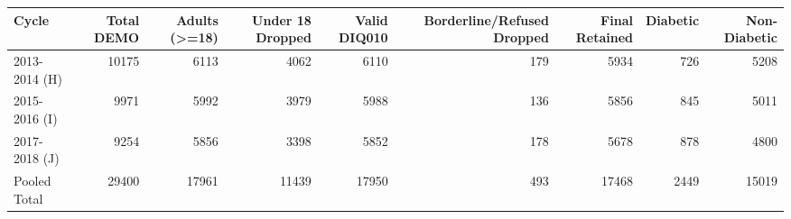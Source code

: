 \begin{tabular}{lrrrrrrrr}
\toprule
Cycle & Total DEMO & Adults (>=18) & Under 18 Dropped & Valid DIQ010 & Borderline/Refused Dropped & Final Retained & Diabetic & Non-Diabetic \\
\midrule
2013-2014 (H) & 10175 & 6113 & 4062 & 6110 & 179 & 5934 & 726 & 5208 \\
2015-2016 (I) & 9971 & 5992 & 3979 & 5988 & 136 & 5856 & 845 & 5011 \\
2017-2018 (J) & 9254 & 5856 & 3398 & 5852 & 178 & 5678 & 878 & 4800 \\
Pooled Total & 29400 & 17961 & 11439 & 17950 & 493 & 17468 & 2449 & 15019 \\
\bottomrule
\end{tabular}
